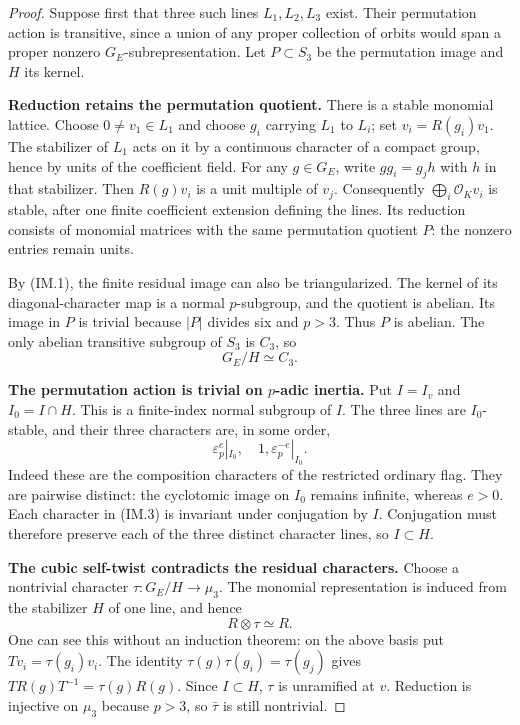 \documentclass[11pt,a4paper]{article}
\theoremstyle{definition}
\renewcommand{\paragraph}[1]{\par\smallskip\noindent\textbf{#1}\quad\ignorespaces}
\begin{document}
\begin{proof}
Suppose first that three such lines $L_1,L_2,L_3$ exist.
Their permutation action is transitive, since a union of any
proper collection of orbits would span a proper nonzero
$G_E$-subrepresentation.  Let $P\subset S_3$ be the permutation
image and $H$ its kernel.

\paragraph{Reduction retains the permutation quotient.}
There is a stable monomial lattice.  Choose $0\ne v_1\in L_1$
and choose $g_i$ carrying $L_1$ to $L_i$; set $v_i=R(g_i)v_1$.
The stabilizer of $L_1$ acts on it by a continuous character
of a compact group, hence by units of the coefficient field.
For any $g\in G_E$, write $g g_i=g_j h$ with $h$ in that
stabilizer.  Then $R(g)v_i$ is a unit multiple of $v_j$.
Consequently $\bigoplus_i\mathcal O_K v_i$ is stable, after
one finite coefficient extension defining the lines.
Its reduction consists of monomial matrices with the same
permutation quotient $P$: the nonzero entries remain units.

By (IM.1), the finite residual image can also be triangularized.
The kernel of its diagonal-character map is a normal
$p$-subgroup, and the quotient is abelian.  Its image in $P$
is trivial because $|P|$ divides six and $p>3$.
Thus $P$ is abelian.  The only abelian transitive subgroup
of $S_3$ is $C_3$, so
\[
                          G_E/H\simeq C_3.                \tag{IM.2}
\]

\paragraph{The permutation action is trivial on $p$-adic inertia.}
Put $I=I_v$ and $I_0=I\cap H$.  This is a finite-index normal
subgroup of $I$.  The three lines are $I_0$-stable, and their
three characters are, in some order,
\[
                  \varepsilon_p^e|_{I_0},\quad1,
                              \varepsilon_p^{-e}|_{I_0}.  \tag{IM.3}
\]
Indeed these are the composition characters of the restricted
ordinary flag.  They are pairwise distinct: the cyclotomic
image on $I_0$ remains infinite, whereas $e>0$.
Each character in (IM.3) is invariant under conjugation by $I$.
Conjugation must therefore preserve each of the three distinct
character lines, so $I\subset H$.

\paragraph{The cubic self-twist contradicts the residual characters.}
Choose a nontrivial character
$\tau:G_E/H\to\mu_3$.  The monomial representation is induced
from the stabilizer $H$ of one line, and hence
\[
                              R\otimes\tau\simeq R.        \tag{IM.4}
\]
One can see this without an induction theorem: on the above
basis put $T v_i=\tau(g_i)v_i$.  The identity
$\tau(g)\tau(g_i)=\tau(g_j)$ gives
$T R(g)T^{-1}=\tau(g)R(g)$.
Since $I\subset H$, $\tau$ is unramified at $v$.
Reduction is injective on $\mu_3$ because $p>3$, so
$\bar\tau$ is still nontrivial.


\end{proof}
\end{document}
